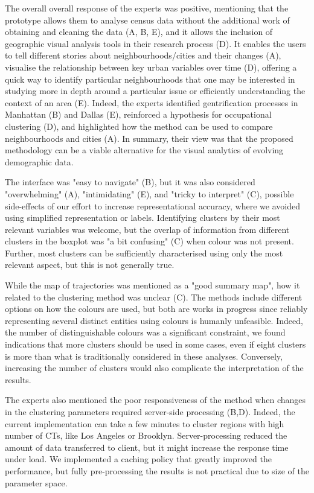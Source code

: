 The overall overall response of the experts was positive,  mentioning that the
prototype allows them to analyse census data without the additional work of
obtaining and cleaning the data (A, B, E), and it allows the inclusion of
geographic visual analysis tools in their research process (D). It enables the
users to tell different stories about neighbourhoods/cities and their changes
(A), visualise the relationship between key urban variables over time (D),
offering a quick way to identify particular neighbourhoods that one may be
interested in studying more in depth around a particular issue or efficiently
understanding the context of an area (E).  Indeed, the experts identified
gentrification processes in Manhattan (B) and Dallas (E), reinforced a
hypothesis for occupational clustering (D), and highlighted how the method can
be used to compare neighbourhoods and cities (A). In summary, their view was that
the proposed methodology can be a viable alternative for the visual analytics of
evolving demographic data.



The interface was "easy to navigate" (B), but it was also considered
"overwhelming" (A), "intimidating" (E), and "tricky to interpret" (C), possible
side-effects of our effort to increase  representational accuracy, where we
avoided using simplified representation or labels. Identifying clusters by their
most relevant variables was welcome, but the overlap of information from
different clusters in the boxplot was "a bit confusing" (C) when colour was not
present. Further, most clusters can be sufficiently characterised using only the
most relevant aspect, but this is not generally true. 


While the map of trajectories was mentioned as a "good summary map", how it
related to the clustering method was unclear (C). The methods include different
options on how the colours are used, but both are works in progress since reliably
representing several distinct entities using colours is humanly unfeasible.
Indeed, the number of distinguishable colours was a significant constraint, we
found indications that more clusters should be used in some cases, even if eight
clusters is more than what is traditionally considered in these analyses.
Conversely, increasing the number of clusters would also complicate the
interpretation of the results.


The experts also mentioned the poor responsiveness of the method when changes in
the clustering parameters required server-side processing (B,D). Indeed, the
current implementation can take a few minutes to cluster regions with high
number of CTs, like Los Angeles or Brooklyn. Server-processing reduced the
amount of data transferred to client, but it might increase the response time
under load. We implemented a caching policy that greatly improved the
performance, but fully pre-processing the results is not practical due to size
of the parameter space.

